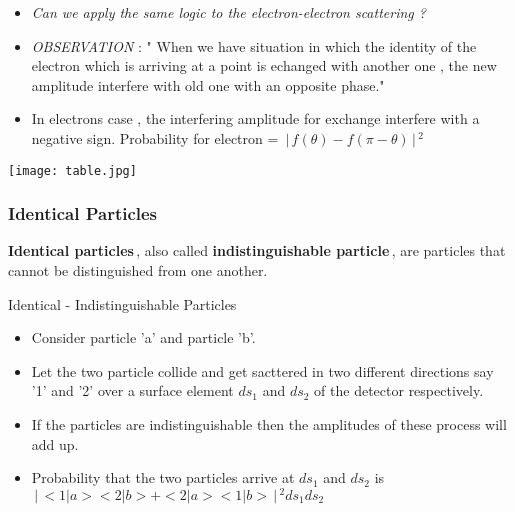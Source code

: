 \documentclass[aspectratio=169]{beamer}
\begin{document}
\begin{frame}
	\begin{itemize}
		\item \textit{Can we apply the same logic to the electron-electron scattering ? }\newline
		\item \textit{OBSERVATION} : " When we have situation in which the identity of the electron which is arriving at a point is echanged with another one , the new amplitude interfere with old one with an opposite phase." \newline
		\item In electrons case , the interfering amplitude for exchange interfere with a negative sign. \newline
		Probability for electron = $\,\Bigr\rvert\,f(\theta)-f(\pi-\theta)\,\Bigr\rvert\,^{2}$
		 \end{itemize}
\end{frame}

\begin{frame}
 \center \texttt{[image: table.jpg]}
	
\end{frame}

\begin{frame}
	\frametitle{Identical Particles}
	
		{\large \textbf{Identical particles}\,, also called \textbf{indistinguishable particle}\,, are particles that cannot be distinguished from one another.}
		
\end{frame}

\begin{frame}{Identical - Indistinguishable Particles}
	\begin{itemize}
		\item Consider particle 'a' and particle 'b'. \newline
		\item Let the two particle collide and get sacttered in two different directions say '1' and '2' over a surface element $ds_{1}$ and $ds_{2}$ of the detector respectively. \newline
		\item If the particles are indistinguishable then the amplitudes of these process will add up. \newline
		\item Probability that the two particles arrive at $ds_{1}$ and $ds_{2}$ is \newline
		$\,\Bigr\rvert\,<1|a><2|b> + <2|a><1|b>\,\Bigr\rvert\,^{2} ds_{1} ds_{2}$
		
	\end{itemize}
\end{frame}
\end{document}
